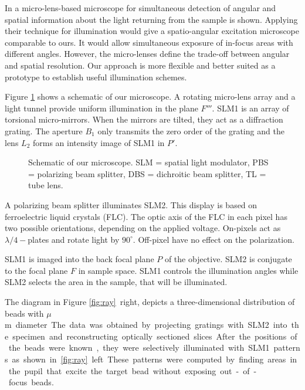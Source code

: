 \documentclass[a4paper, 11pt]{article}
\begin{document}
\begin{multicols}{2}
In \cite{Levoy2009} a micro-lens-based microscope for simultaneous
detection of angular and spatial information about the light returning
from the sample is shown. Applying their technique for illumination
would give a spatio-angular excitation microscope comparable to
ours. It would allow simultaneous exposure of in-focus areas with
different angles. However, the micro-lenses define the trade-off
between angular and spatial resolution. Our approach is more flexible
and better suited as a prototype to establish useful illumination
schemes.

 Figure \ref{fig:system}
shows a schematic of our microscope. A rotating micro-lens array and a
light tunnel provide uniform illumination in the plane $F'''$. SLM1 is
an array of torsional micro-mirrors. When the mirrors are tilted, they
act as a diffraction grating. The aperture $B_1$ only transmits the
zero order of the grating and the lens $L_2$ forms an intensity image
of SLM1 in $P'$.
\begin{figure}[H]
\centering
{\scriptsize }
\caption{Schematic of our microscope. SLM = spatial light modulator,
  PBS = polarizing beam splitter, DBS = dichroitic beam splitter, TL =
  tube lens. %
}
\label{fig:system}
\end{figure}

\noindent
A polarizing beam splitter illuminates SLM2. This display is based on
ferroelectric liquid crystals (FLC). The optic axis of the FLC in each
pixel has two possible orientations, depending on the applied
voltage. On-pixels act as $\lambda/4-$plates and rotate light by
$90^\circ$. Off-pixel have no effect on the polarization.


SLM1 is imaged into the back focal plane $P$ of the objective. SLM2 is
conjugate to the focal plane $F$ in sample space.  SLM1 controls the
illumination angles while SLM2 selects the area in the sample, that
will be illuminated.


The diagram in Figure \ref{fig:ray}~right, depicts a three-dimensional
distribution of beads with \unit[2]{$\mu$m} diameter. The data was
obtained by projecting gratings with SLM2 into the specimen and
reconstructing optically sectioned slices. After the positions of the
beads were known, they were selectively illuminated with SLM1 patterns
as shown in \ref{fig:ray}~left. These patterns were computed by
finding areas in the pupil that excite the target bead without
exposing out-of-focus beads.


\end{multicols}
\end{document}
